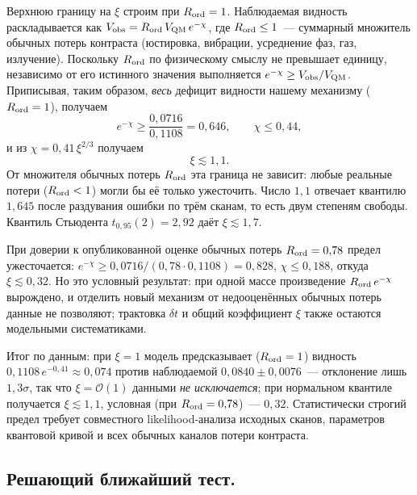 \documentclass[12pt,a4paper]{article}
\begin{document}
Верхнюю границу на $\xi$ строим при $R_{\rm ord}=1$. Наблюдаемая видность раскладывается как $V_{\rm obs}=R_{\rm ord}\,V_{\rm QM}\,e^{-\chi}$, где $R_{\rm ord}\le1$~--- суммарный множитель обычных потерь контраста (юстировка, вибрации, усреднение фаз, газ, излучение). Поскольку $R_{\rm ord}$ по физическому смыслу не превышает единицу, независимо от его истинного значения выполняется $e^{-\chi}\ge V_{\rm obs}/V_{\rm QM}$. Приписывая, таким образом, \emph{весь} дефицит видности нашему механизму ($R_{\rm ord}=1$), получаем
\begin{equation}
e^{-\chi}\ge\frac{0{,}0716}{0{,}1108}=0{,}646,
\qquad
\chi\le0{,}44,
\end{equation}
и из $\chi=0{,}41\,\xi^{2/3}$ получаем
\begin{equation}
\boxed{\;\xi\lesssim 1{,}1.\;}
\end{equation}
От множителя обычных потерь $R_{\rm ord}$ эта граница не зависит: любые реальные потери ($R_{\rm ord}<1$) могли бы её только ужесточить. Число $1{,}1$ отвечает квантилю $1{,}645$ после раздувания ошибки по трём сканам, то есть двум степеням свободы. Квантиль Стьюдента $t_{0{,}95}(2)=2{,}92$ даёт $\xi\lesssim1{,}7$.

При доверии к опубликованной оценке обычных потерь $R_{\rm ord}=0{,}78$ предел ужесточается: $e^{-\chi}\ge0{,}0716/(0{,}78\cdot0{,}1108)=0{,}828$, $\chi\le0{,}188$, откуда $\xi\lesssim0{,}32$. Но это условный результат: при одной массе произведение $R_{\rm ord}\,e^{-\chi}$ вырождено, и отделить новый механизм от недооценённых обычных потерь данные не позволяют; трактовка $\delta t$ и общий коэффициент $\xi$ также остаются модельными систематиками.

Итог по данным: при $\xi=1$ модель предсказывает ($R_{\rm ord}=1$) видность $0{,}1108\,e^{-0{,}41}\approx0{,}074$ против наблюдаемой $0{,}0840\pm0{,}0076$~--- отклонение лишь $1{,}3\sigma$, так что $\xi=\mathcal O(1)$ данными \emph{не исключается}; при нормальном квантиле получается $\xi\lesssim1{,}1$, условная (при $R_{\rm ord}=0{,}78$)~--- $0{,}32$. Статистически строгий предел требует совместного likelihood-анализа исходных сканов, параметров квантовой кривой и всех обычных каналов потери контраста.

\subsection{Решающий ближайший тест.}
\label{sec:decisive_test}
\end{document}
